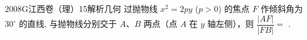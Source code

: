
\begin{problem}{2008}{G}{江西卷（理）}{15}{解析几何}
过抛物线 $ x^2 = 2py $ ($ p > 0 $) 的焦点 $ F $ 作倾斜角为 $ 30^\circ $ 的直线, 与抛物线分别交于 $ A $、$ B $ 两点（点 $ A $ 在 $ y $ 轴左侧），则 $ \dfrac{|AF|}{|FB|} = $ \underline{\hspace{4em}}.
\end{problem}

\begin{answer}

\end{answer}

\begin{solutions}

\end{solutions}